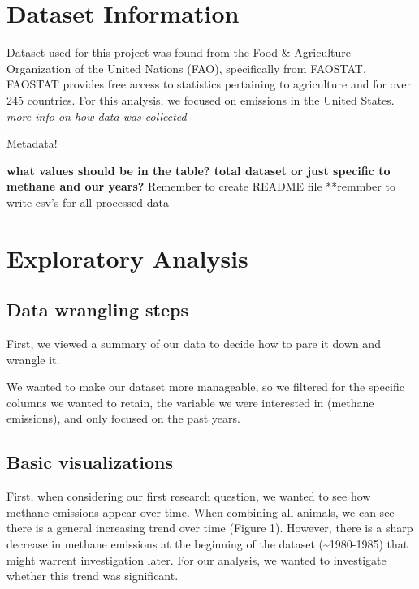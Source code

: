 \documentclass[
  12pt,
]{article}
\begin{document}
\newpage

\hypertarget{dataset-information}{%
\section{Dataset Information}\label{dataset-information}}

Dataset used for this project was found from the Food \& Agriculture
Organization of the United Nations (FAO), specifically from FAOSTAT.
FAOSTAT provides free access to statistics pertaining to agriculture and
for over 245 countries. For this analysis, we focused on emissions in
the United States. \emph{more info on how data was collected}

Metadata!

\textbf{what values should be in the table? total dataset or just
specific to methane and our years? }Remember to create README file
**remmber to write csv's for all processed data

\newpage

\hypertarget{exploratory-analysis}{%
\section{Exploratory Analysis}\label{exploratory-analysis}}

\hypertarget{data-wrangling-steps}{%
\subsection{Data wrangling steps}\label{data-wrangling-steps}}

First, we viewed a summary of our data to decide how to pare it down and
wrangle it.

We wanted to make our dataset more manageable, so we filtered for the
specific columns we wanted to retain, the variable we were interested in
(methane emissions), and only focused on the past years.

\hypertarget{basic-visualizations}{%
\subsection{Basic visualizations}\label{basic-visualizations}}

First, when considering our first research question, we wanted to see
how methane emissions appear over time. When combining all animals, we
can see there is a general increasing trend over time (Figure 1).
However, there is a sharp decrease in methane emissions at the beginning
of the dataset (\textasciitilde1980-1985) that might warrent
investigation later. For our analysis, we wanted to investigate whether
this trend was significant.
\end{document}
